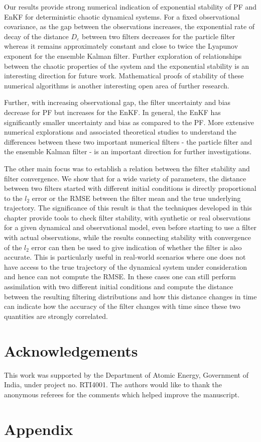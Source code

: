 Our results provide strong numerical indication of exponential stability of PF and EnKF for deterministic chaotic dynamical systems. For a fixed observational covariance, as the gap between the observations increases, the exponential rate of decay of the distance $D_\varepsilon$ between two filters decreases for the particle filter whereas it remains approximately constant and close to twice the Lyapunov exponent for the ensemble Kalman filter. {\color{mypink} Further exploration of relationships between the chaotic properties of the system and the exponential stability is an interesting direction for future work.} Mathematical proofs of stability of these numerical algorithms is another interesting open area of further research.

Further, with increasing observational gap, the filter uncertainty and bias decrease for PF but increases for the EnKF. In general, the EnKF has significantly smaller uncertainty and bias as compared to the PF. More extensive numerical explorations and associated theoretical studies to understand the differences between these two important numerical filters - the particle filter and the ensemble Kalman filter - is an important direction for further investigations.

The other main focus was to establish a relation between the filter stability and filter convergence. We show that for a wide variety of parameters, the distance between two filters started with different initial conditions is directly proportional to the $l_2$ error or the RMSE between the filter mean and the true underlying trajectory. The significance of this result is that the techniques developed in this chapter provide tools to check filter stability, with synthetic or real observations for a given dynamical and observational model, even before starting to use a filter with actual observations, while the results connecting stability with convergence of the $l_2$ error can then be used to give indication of whether the filter is also accurate. This is particularly useful in real-world scenarios where one does not have access to the true trajectory of the dynamical system under consideration and hence can not compute the RMSE. In these cases one can still perform assimilation with two different initial conditions and compute the distance between the resulting filtering distributions and how this distance changes in time can indicate how the accuracy of the filter changes with time since these two quantities are strongly correlated. 

\section*{Acknowledgements}
This work was supported by the Department of Atomic Energy, Government of India, under project no. RTI4001. The authors would like to thank the anonymous referees for the comments which helped improve the manuscript.

\section{Appendix}\label{sec-append--probing-nfs}











